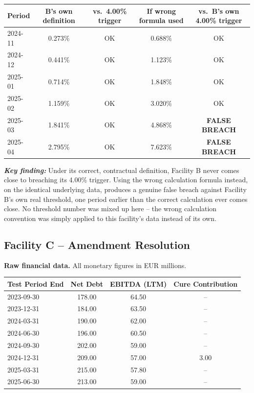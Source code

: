 \documentclass[11pt,a4paper]{article}
\newcommand{\keyfinding}[1]{%
  \begin{tcolorbox}[colback=white, colframe=black, boxrule=0.6pt, arc=1pt, left=8pt, right=8pt, top=6pt, bottom=6pt]
  \textbf{\textit{Key finding:}} #1
  \end{tcolorbox}
}
\begin{document}
\begin{center}
\renewcommand{\arraystretch}{1.25}
\small
\begin{tabular}{@{}lcccc@{}}
\toprule
\textbf{Period} & \textbf{B's own definition} & \textbf{vs.\ 4.00\% trigger} & \textbf{If wrong formula used} & \textbf{vs.\ B's own 4.00\% trigger} \\
\midrule
2024-11 & 0.273\% & OK & 0.688\% & OK \\
2024-12 & 0.441\% & OK & 1.123\% & OK \\
2025-01 & 0.714\% & OK & 1.848\% & OK \\
2025-02 & 1.159\% & OK & 3.020\% & OK \\
2025-03 & 1.841\% & OK & 4.868\% & \textbf{FALSE BREACH} \\
2025-04 & 2.795\% & OK & 7.623\% & \textbf{FALSE BREACH} \\
\bottomrule
\end{tabular}
\end{center}

\keyfinding{Under its correct, contractual definition, Facility B never comes close to breaching its 4.00\% trigger. Using the wrong calculation formula instead, on the identical underlying data, produces a genuine false breach against Facility B's own real threshold, one period earlier than the correct calculation ever comes close. No threshold number was mixed up here -- the wrong calculation convention was simply applied to this facility's data instead of its own.}

\subsection{Facility C -- Amendment Resolution}

\textbf{Raw financial data.} All monetary figures in EUR millions.

\begin{center}
\renewcommand{\arraystretch}{1.25}
\small
\begin{tabular}{@{}lccc@{}}
\toprule
\textbf{Test Period End} & \textbf{Net Debt} & \textbf{EBITDA (LTM)} & \textbf{Cure Contribution} \\
\midrule
2023-09-30 & 178.00 & 64.50 & -- \\
2023-12-31 & 184.00 & 63.50 & -- \\
2024-03-31 & 190.00 & 62.00 & -- \\
2024-06-30 & 196.00 & 60.50 & -- \\
2024-09-30 & 202.00 & 59.00 & -- \\
2024-12-31 & 209.00 & 57.00 & 3.00 \\
2025-03-31 & 215.00 & 57.80 & -- \\
2025-06-30 & 213.00 & 59.00 & -- \\
\bottomrule
\end{tabular}
\end{center}
\end{document}
